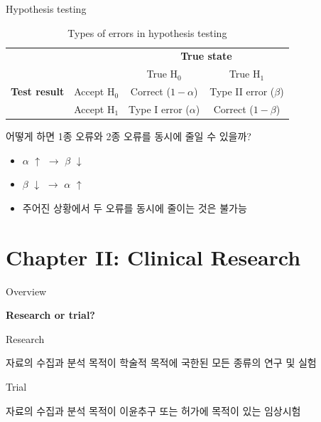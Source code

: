 \documentclass[9pt,ignorenonframetext,xcolor=dvipsnames]{beamer}
\providecommand{\tightlist}{%
  \setlength{\itemsep}{0pt}\setlength{\parskip}{0pt}}
\newlength{\wideitemsep}
\let\olditem\item
\renewcommand{\item}{\setlength{\itemsep}{\wideitemsep}\olditem}
\begin{document}
\begin{frame}{Hypothesis testing}

\begin{table}
  \centering
  \caption{Types of errors in hypothesis testing}
  \begingroup\footnotesize
  \begin{tabular}{cccc}
  \toprule
                              &                         & \multicolumn{2}{c}{\textbf{True state}} \\ \cmidrule(l){3-4}
                              &                         & True $\mathrm{H}_{0}$    & True $\mathrm{H}_{1}$ \\
  \midrule
  \textbf{Test result}       & Accept $\mathrm{H}_{0}$  & Correct ($1-\alpha$)     & Type II error ($\beta$)\\
                             & Accept $\mathrm{H}_{1}$  & Type I error ($\alpha$)  &  Correct ($1-\beta$) \\
  \bottomrule                  
  \end{tabular}
  \endgroup
\end{table}

어떻게 하면 1종 오류와 2종 오류를 동시에 줄일 수 있을까?

\begin{itemize}
\tightlist
\item
  \(\alpha\) \(\uparrow\) \(\rightarrow\) \(\beta\) \(\downarrow\)
\item
  \(\beta\) \(\downarrow\) \(\rightarrow\) \(\alpha\) \(\uparrow\)
\item
  주어진 상황에서 두 오류를 동시에 줄이는 것은 불가능
\end{itemize}

\end{frame}

\section{Chapter II: Clinical
Research}\label{chapter-ii-clinical-research}

\begin{frame}{Overview}

\LARGE{\textbf{Research or trial?}}

\begin{block}{Research}

\normalsize{자료의 수집과 분석 목적이 학술적 목적에 국한된 모든 종류의 연구 및 실험}

\end{block}

\begin{block}{Trial}

\normalsize{자료의 수집과 분석 목적이 이윤추구 또는 허가에 목적이 있는 임상시험}

\end{block}

\end{frame}
\end{document}
